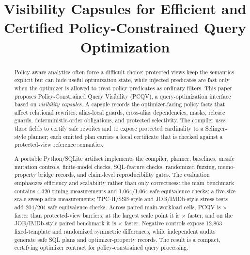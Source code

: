 \documentclass[conference]{IEEEtran}
\newcommand{\pcqv}{PCQV}
\begin{document}
\title{Visibility Capsules for Efficient and Certified Policy-Constrained Query Optimization}

\author{%
}

\maketitle



\begin{abstract}
Policy-aware analytics often force a difficult choice: protected views keep the semantics explicit but can hide useful optimization state, while injected predicates are fast only when the optimizer is allowed to treat policy predicates as ordinary filters. This paper proposes Policy-Constrained Query Visibility (\pcqv), a query-optimization interface based on \emph{visibility capsules}. A capsule records the optimizer-facing policy facts that affect relational rewrites: alias-local guards, cross-alias dependencies, masks, release guards, deterministic-order obligations, and protected selectivity. The compiler uses these fields to certify safe rewrites and to expose protected cardinality to a Selinger-style planner; each emitted plan carries a local certificate that is checked against a protected-view reference semantics.

A portable Python/SQLite artifact implements the compiler, planner, baselines, unsafe mutation controls, finite-model checks, SQL-feature checks, randomized fuzzing, memo-property bridge records, and claim-level reproducibility gates. The evaluation emphasizes efficiency and scalability rather than only correctness: the main benchmark contains 4,320 timing measurements and 1,064/1,064 safe equivalence checks; a five-size scale sweep adds \ScaleSweepRows{} measurements; TPC-H/SSB-style and JOB/IMDb-style stress tests add 204/204 safe equivalence checks. Across paired main-workload cells, \pcqv{} is \PcqvSpeedView{}$\times$ faster than protected-view barriers; at the largest scale point it is \ScaleLargestViewSpeedup{}$\times$ faster; and on the JOB/IMDb-style paired benchmark it is \JobPairedSpeedView{}$\times$ faster. Negative controls expose 12,863 fixed-template and \RandomFuzzDiffs{} randomized symmetric differences, while independent audits generate \PortableSQLGenerated{} safe SQL plans and \MemoCandidateRecords{} optimizer-property records. The result is a compact, certifying optimizer contract for policy-constrained query processing.
\end{abstract}
\end{document}
